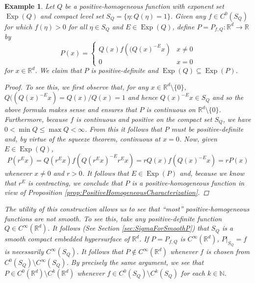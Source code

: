 \documentclass[11pt]{article}
\newtheorem{example}{Example}
\theoremstyle{remark}
\newcommand*{\myproofname}{Proof}
\newenvironment{subproof}[1][\myproofname]{\begin{proof}[#1]\renewcommand*{\qedsymbol}{$\mathbin{/\mkern-6mu/}$}}{\end{proof}}
\newcommand\Exp{\operatorname{Exp}}
\begin{document}
\begin{example}\label{exp:Weierstrass}\normalfont
Let $Q$ be a positive-homogeneous function with exponent set $\Exp(Q)$ and compact level set $S_Q=\{\eta:Q(\eta)=1\}$. Given any $f\in C^0(S_Q)$ for which $f(\eta)>0$ for all $\eta\in S_Q$ and $E\in \Exp(Q)$, define $P=P_{f,Q}:\mathbb{R}^d\to\mathbb{R}$ by
\begin{equation*}
P(x)=\begin{cases}
Q(x)f\left((Q(x)^{-E}x\right) & x\neq 0\\
0 & x=0
\end{cases}
\end{equation*}
for $x\in\mathbb{R}^d$. We claim that $P$ is positive-definite and $\Exp(Q)\subseteq \Exp(P)$.

\begin{subproof}To see this, we first observe that, for any $x\in\mathbb{R}^d\setminus \{0\}$, $Q((Q(x)^{-E}x)=Q(x)/Q(x)=1$ and hence $Q(x)^{-E}x\in S_Q$ and so the above formula makes sense and ensures that $P$ is continuous on $\mathbb{R}^d\setminus\{0\}$. Furthermore, because $f$ is continuous and positive on the compact set $S_Q$, we have $0<\min Q\leq \max Q<\infty$. From this it follows that $P$ must be positive-definite and, by virtue of the squeeze theorem, continuous at $x=0$. Now, given $E\in\Exp(Q)$,
\begin{equation*}
P(r^Ex)=Q(r^Ex)f(Q(r^Ex)^{-E}r^Ex)=rQ(x)f(Q(x)^{-E}x)=rP(x)
\end{equation*}
whenever $x\neq 0$ and $r>0$. It follows that $E\in\Exp(P)$ and, because we know that $r^E$ is contracting, we conclude that $P$ is a positive-homogeneous function in view of Proposition \ref{prop:PositiveHomogeneousCharacterization}. 
\end{subproof}
The utility of this construction allows us to see that ``most'' positive-homogeneous functions are not smooth. To see this, take any positive-definite function $Q\in C^{\infty}(\mathbb{R}^d)$. It follows (See Section \ref{sec:SigmaForSmoothP}) that $S_Q$ is a smooth compact embedded hypersurface of $\mathbb{R}^d$. If $P=P_{f,Q}$ is $C^\infty(\mathbb{R}^d)$, $P\vert_{S_Q}=f$ is necessarily $C^\infty(S_Q)$. It follows that $P\notin C^\infty(\mathbb{R}^d)$ whenever $f$ is chosen from $C^0(S_Q)\setminus C^\infty(S_Q)$. By precisely the same argument, we see that $P\in C^0(\mathbb{R}^d)\setminus C^k(\mathbb{R}^d)$ whenever $f\in C^0(S_Q)\setminus C^k(S_Q)$ for each $k\in\mathbb{N}$.\\


\end{example}
\end{document}
